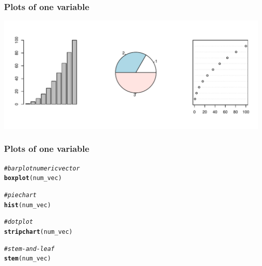 \documentclass[12pt]{beamer}\usepackage[]{graphicx}\usepackage[]{color}
\makeatletter
\newcommand{\hlcom}[1]{\textcolor[rgb]{0.678,0.584,0.686}{\textit{#1}}}%
\newcommand{\hlstd}[1]{\textcolor[rgb]{0.345,0.345,0.345}{#1}}%
\newcommand{\hlkwd}[1]{\textcolor[rgb]{0.737,0.353,0.396}{\textbf{#1}}}%
\newenvironment{kframe}{%
 \def\at@end@of@kframe{}%
 \ifinner\ifhmode%
  \def\at@end@of@kframe{\end{minipage}}%
  \begin{minipage}{\columnwidth}%
 \fi\fi%
 \def\FrameCommand##1{\hskip\@totalleftmargin \hskip-\fboxsep
 \colorbox{shadecolor}{##1}\hskip-\fboxsep
     \hskip-\linewidth \hskip-\@totalleftmargin \hskip\columnwidth}%
 \MakeFramed {\advance\hsize-\width
   \@totalleftmargin\z@ \linewidth\hsize
   \@setminipage}}%
 {\par\unskip\endMakeFramed%
 \at@end@of@kframe}
\newenvironment{knitrout}{}{} %
\makeatother
\begin{document}
\begin{frame}[fragile]
\frametitle{Plots of one variable}
\begin{knitrout}\footnotesize
{}\color{fgcolor}

{\centering \includegraphics[width=.95\linewidth,height=.5\linewidth]{figure/plot_single2-1} 

}



\end{knitrout}
\end{frame}


\begin{frame}[fragile]
\frametitle{Plots of one variable}
\begin{knitrout}\footnotesize
{}\color{fgcolor}\begin{kframe}
\begin{alltt}
\hlcom{# barplot numeric vector}
\hlkwd{boxplot}\hlstd{(num_vec)}

\hlcom{# pie chart}
\hlkwd{hist}\hlstd{(num_vec)}

\hlcom{# dot plot}
\hlkwd{stripchart}\hlstd{(num_vec)}

\hlcom{# stem-and-leaf}
\hlkwd{stem}\hlstd{(num_vec)}
\end{alltt}
\end{kframe}
\end{knitrout}
\end{frame}

\end{document}
